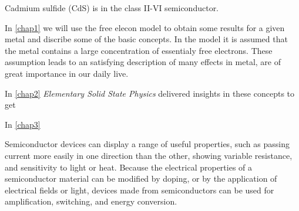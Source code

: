 Cadmium sulfide (CdS) is in the class II-VI semiconductor.

In \ref{chap1}  we will use the free elecon model 
to obtain some results for a given metal and discribe some of the
basic concepts. In the model it is assumed that the metal contains 
a large concentration of essentialy free electrons. These assumption
leads to an satisfying description of many effects in metal, are of great importance in our daily live.

In \ref{chap2}  
\textit{Elementary Solid State Physics} \cite{elementary_SSP} delivered insights in these concepts to get 

 In \ref{chap3}  

 Semiconductor devices can display a range of useful properties, such as passing current more easily in one direction than the other, showing variable resistance, and sensitivity to light or heat. Because the electrical properties of a semiconductor material can be modified by doping, or by the application of electrical fields or light, devices made from semiconductors can be used for amplification, switching, and energy conversion.
